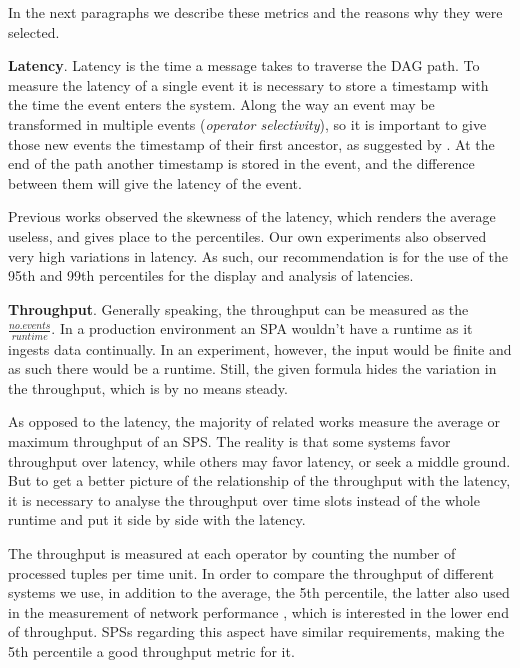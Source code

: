 \documentclass[ppgc,diss,english]{iiufrgs}
\begin{document}
In the next paragraphs we describe these metrics and the reasons why they were selected.

\textbf{Latency}. Latency is the time a message takes to traverse the DAG path. To measure the latency of a single event it is necessary to store a timestamp with the time the event enters the system. Along the way an event may be transformed in multiple events (\emph{operator selectivity}), so it is important to give those new events the timestamp of their first ancestor, as suggested by \cite{chandramouli2011accurate}. At the end of the path another timestamp is stored in the event, and the difference between them will give the latency of the event.

Previous works \cite{dayarathna2011performance, akidau2013millwheel, castro2013integrating} observed the skewness of the latency, which renders the average useless, and gives place to the percentiles. Our own experiments also observed very high variations in latency. As such, our recommendation is for the use of the 95th and 99th percentiles for the display and analysis of latencies.

\textbf{Throughput}. Generally speaking, the throughput can be measured as the $\frac{no. events}{runtime}$. In a production environment an SPA wouldn't have a runtime as it ingests data continually. In an experiment, however, the input would be finite and as such there would be a runtime. Still, the given formula hides the variation in the throughput, which is by no means steady.

As opposed to the latency, the majority of related works measure the average or maximum throughput of an SPS. The reality is that some systems favor throughput over latency, while others may favor latency, or seek a middle ground. But to get a better picture of the relationship of the throughput with the latency, it is necessary to analyse the throughput over time slots instead of the whole runtime and put it side by side with the latency.

The throughput is measured at each operator by counting the number of processed tuples per time unit. In order to compare the throughput of different systems we use, in addition to the average, the 5th percentile, the latter also used in the measurement of network performance \cite{litjens2010potential, landstrom2011deployment}, which is interested in the lower end of throughput. SPSs regarding this aspect have similar requirements, making the 5th percentile a good throughput metric for it.
\end{document}

